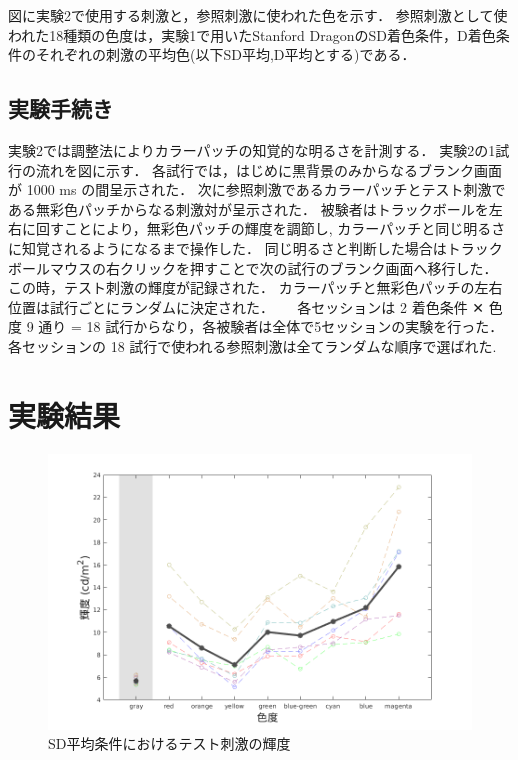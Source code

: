         図に実験2で使用する刺激と，参照刺激に使われた色を示す．
        参照刺激として使われた18種類の色度は，実験1で用いたStanford DragonのSD着色条件，D着色条件のそれぞれの刺激の平均色(以下SD平均,D平均とする)である．

    \subsection{実験手続き}

        実験2では調整法によりカラーパッチの知覚的な明るさを計測する．
        実験2の1試行の流れを図に示す．
        各試行では，はじめに黒背景のみからなるブランク画面が 1000 ms の間呈示された．
        次に参照刺激であるカラーパッチとテスト刺激である無彩色パッチからなる刺激対が呈示された．
        被験者はトラックボールを左右に回すことにより，無彩色パッチの輝度を調節し, カラーパッチと同じ明るさに知覚されるようになるまで操作した．
        同じ明るさと判断した場合はトラックボールマウスの右クリックを押すことで次の試行のブランク画面へ移行した．
        この時，テスト刺激の輝度が記録された．
        カラーパッチと無彩色パッチの左右位置は試行ごとにランダムに決定された．
        　
        各セッションは 2 着色条件 ✕ 色度 9 通り = 18 試行からなり，各被験者は全体で5セッションの実験を行った．
        各セッションの 18 試行で使われる参照刺激は全てランダムな順序で選ばれた.

\section{実験結果}

    \begin{figure}[h]
        \centering
        \includegraphics[width=14.0cm]{./img/ex2_res_SD_p.png}
        \caption{SD平均条件におけるテスト刺激の輝度}
        \label{ex2_SD}
    \end{figure}

